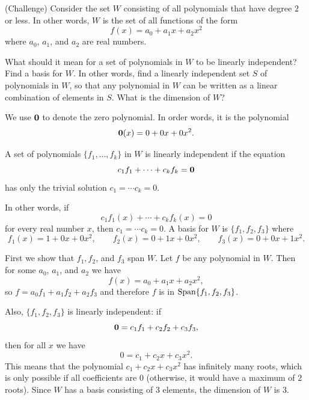 \begin{problems}
 \problem  (Challenge) Consider the set $W$ consisting of all polynomials that have degree
  $2$ or less.  In other words, $W$ is the set of all functions of the
  form
  \[f(x) = a_0 + a_1 x + a_2 x^2\]
  where $a_0$, $a_1$, and $a_2$ are real numbers.
  \begin{subproblems}
    \subproblem What should it mean for a set of polynomials in $W$ to be
    linearly independent? %
    \subproblem Find a basis for $W$.  In other words, find a linearly
    independent set $S$ of polynomials in $W$, so that any polynomial in $W$ can
    be written as a linear combination of elements in $S$.
    \subproblem What is the dimension of $W$?
  \end{subproblems}
  \begin{solution}
    We use ${\bf 0}$ to denote the zero polynomial.  In order words, it is the
    polynomial \[{\bf 0}(x) = 0 + 0 x + 0x^2.\]
  \begin{subproblems}
    \subproblem A set of polynomials $\{f_1, \ldots, f_k\}$ in $W$ is linearly
    independent if the equation
      \[c_1 f_1 + \cdots + c_k f_k = {\bf 0}\]
      has only the trivial solution $c_1 = \cdots c_k = 0$.

      In other words, if 
      \[c_1 f_1(x) + \cdots + c_k f_k(x) = 0\] for every real number $x$, then
      $c_1 = \cdots c_k = 0$.  %
      \subproblem A basis for $W$ is $\{f_1, f_2, f_3\}$ where
      \[f_1(x) = 1 + 0x + 0x^2, \qquad f_2(x) = 0 + 1x + 0x^2, 
      \qquad f_3(x) = 0 + 0x + 1x^2.\]
      
    First we show that $f_1, f_2$, and $f_3$ span $W$.  Let $f$ be any
    polynomial in $W$.  Then for some $a_0$, $a_1$, and $a_2$ we have
      \[f(x) = a_0 + a_1 x + a_2 x^2,\]
      so $f= a_0 f_1 + a_1 f_2 + a_2 f_3$ and therefore $f$ is in 
      $\textup{Span}\{f_1, f_2, f_3\}$.
      
      Also, $\{f_1, f_2, f_3\}$ is linearly independent: if 
      \[{\bf 0} = c_1 f_1 + c_2 f_2 + c_3 f_3,\]
      then for all $x$ we have
      \[0 = c_1 + c_2 x + c_3 x^2.\] This means that the polynomial
      $c_1 + c_2 x + c_3 x^2$ has infinitely many roots, which is only possible
      if all coefficients are $0$ (otherwise, it would have a maximum of $2$
      roots).  %
      \subproblem Since $W$ has a basis consisting of $3$ elements, the
      dimension of $W$ is $3$.
  \end{subproblems}
  \end{solution}
 \end{problems} \setcounter{problem}{0}


